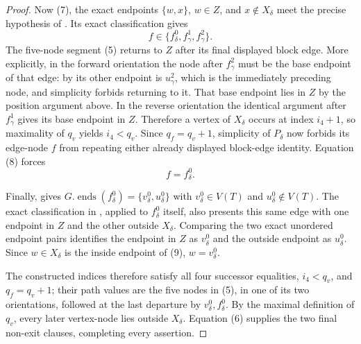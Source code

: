 \begin{proof}
Now (7), the exact endpoints $\{w,x\}$, $w\in Z$, and
$x\notin X_\delta$ meet the precise hypothesis of
.  Its
exact classification gives
\[
                    f\in\{f^0_\delta,f^1_\gamma,f^2_\gamma\}.  \tag{8}
\]
The five-node segment (5) returns to $Z$ after its final displayed block
edge.  More explicitly, in the forward orientation the node after
$f^2_\gamma$ must be the base endpoint of that edge: by
 its other endpoint is
$u^2_\gamma$, which is the immediately preceding node, and simplicity
forbids returning to it.  That base endpoint lies in $Z$ by the position
argument above.  In the reverse orientation the identical argument
after $f^1_\gamma$ gives its base endpoint in $Z$.  Therefore a vertex of
$X_\delta$ occurs at index $i_4+1$, so maximality of $q_v$ yields
$i_4<q_v$.  Since $q_f=q_v+1$, simplicity of $P_\delta$ now forbids its
edge-node $f$ from repeating either already displayed block-edge
identity.  Equation (8) forces
\[
                              f=f^0_\delta.                     \tag{9}
\]

Finally,  gives
$G.\operatorname{ends}(f^0_\delta)=
\{v^0_\delta,u^0_\delta\}$ with $v^0_\delta\in V(T)$ and
$u^0_\delta\notin V(T)$.  The exact classification in
, applied to
$f^0_\delta$ itself, also presents this same edge with one endpoint in
$Z$ and the other outside $X_\delta$.  Comparing the two exact unordered
endpoint pairs identifies the endpoint in $Z$ as $v^0_\delta$ and the
outside endpoint as $u^0_\delta$.  Since $w\in X_\delta$ is the inside
endpoint of (9), $w=v^0_\delta$.

The constructed indices therefore satisfy all four successor
equalities, $i_4<q_v$, and $q_f=q_v+1$; their path values are the five
nodes in (5), in one of its two orientations, followed at the last
departure by $v^0_\delta,f^0_\delta$.  By the maximal definition of
$q_v$, every later vertex-node lies outside $X_\delta$.  Equation (6)
supplies the two final non-exit clauses, completing every assertion.
\end{proof}

